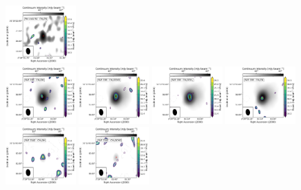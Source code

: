 \begin{figure}[htbp!]
  \includegraphics[width=0.24\textwidth]{./moment0/Set2_ID04_CH3CN_257527.pdf}
  \\
  \includegraphics[width=0.24\textwidth]{./moment0/Set2_ID08_CH3OH_243915.pdf}
  \includegraphics[width=0.24\textwidth]{./moment0/Set2_ID08_CH3OCHO_259342.pdf}
  \includegraphics[width=0.24\textwidth]{./moment0/Set2_ID08_CH3OCH3_259311.pdf}
  \includegraphics[width=0.24\textwidth]{./moment0/Set2_ID08_CH3CN_257527.pdf}
  \\
  \includegraphics[width=0.24\textwidth]{./moment0/Set2_ID00_2_CH3OH_243915.pdf}
  \includegraphics[width=0.24\textwidth]{./moment0/Set2_ID00_2_CH3OCHO_259342.pdf}

\end{figure}
